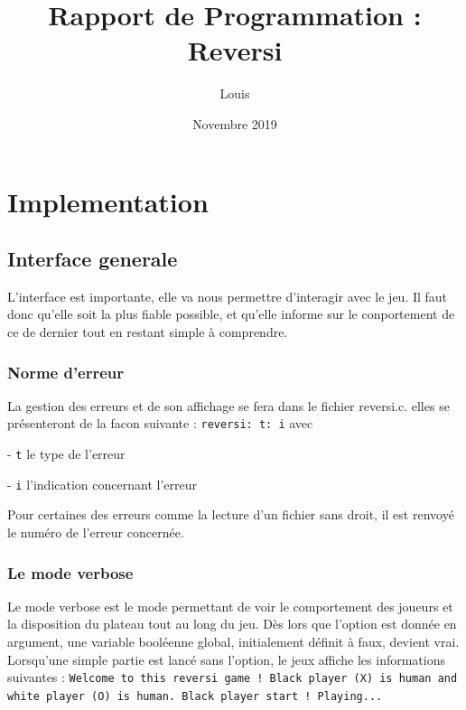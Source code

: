 \documentclass{report}
\title{Rapport de Programmation : Reversi}
\author{Louis \bsc{Coumau}}
\date{Novembre 2019}
\begin{document}

\maketitle %

\tableofcontents



\chapter{Implementation}

\section{Interface generale}
L'interface est importante, elle va nous permettre d'interagir avec le jeu. Il faut donc qu'elle soit la plus fiable possible, et qu'elle informe sur le conportement de ce de dernier tout en restant simple à comprendre.
\subsection{Norme d'erreur}
La gestion des erreurs et de son affichage se fera dans le fichier reversi.c. elles se présenteront de la facon suivante : \texttt{reversi: t: i} avec

- \texttt{t} le type de l'erreur

- \texttt{i} l'indication concernant l'erreur

Pour certaines des erreurs comme la lecture d'un fichier sans droit, il est renvoyé le numéro de l'erreur concernée.

\subsection{Le mode verbose}
Le mode verbose est le mode permettant de voir le comportement des joueurs et la disposition du plateau tout au long du jeu.
Dès lors que l'option est donnée en argument, une variable booléenne global, initialement définit à faux, devient vrai.
Lorsqu'une simple partie est lancé sans l'option, le jeux affiche les informations suivantes : \newline
\newline
\texttt{Welcome to this reversi game !\newline
Black player (X) is human and white player (O) is human.\newline
Black player start !\newline
\newline
Playing...}\newline
\end{document}
